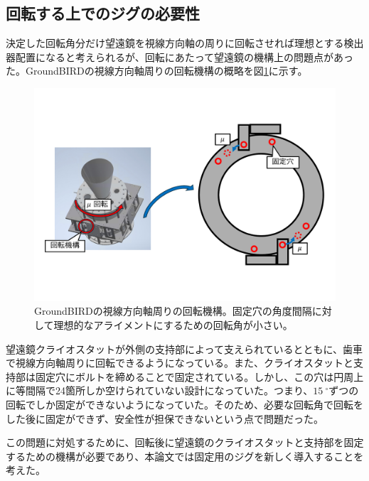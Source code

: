 \subsection{回転する上でのジグの必要性}
決定した回転角分だけ望遠鏡を視線方向軸の周りに回転させれば理想とする検出器配置になると考えられるが、回転にあたって望遠鏡の機構上の問題点があった。GroundBIRDの視線方向軸周りの回転機構の概略を図\ref{gb_fixing_system}に示す。
\begin{figure}[htbp]
  \centering
  \includegraphics[width=0.95\columnwidth]{5_alignment/figs/gb_fixing_system.pdf}
  \caption{GroundBIRDの視線方向軸周りの回転機構。固定穴の角度間隔に対して理想的なアライメントにするための回転角が小さい。}
  \label{gb_fixing_system}
\end{figure}
望遠鏡クライオスタットが外側の支持部によって支えられているとともに、歯車で視線方向軸周りに回転できるようになっている。また、クライオスタットと支持部は固定穴にボルトを締めることで固定されている。しかし、この穴は円周上に等間隔で24箇所しか空けられていない設計になっていた。つまり、$\SI{15}{^{\circ}}$ずつの回転でしか固定ができないようになっていた。そのため、必要な回転角で回転をした後に固定ができず、安全性が担保できないという点で問題だった。

この問題に対処するために、回転後に望遠鏡のクライオスタットと支持部を固定するための機構が必要であり、本論文では固定用のジグを新しく導入することを考えた。

